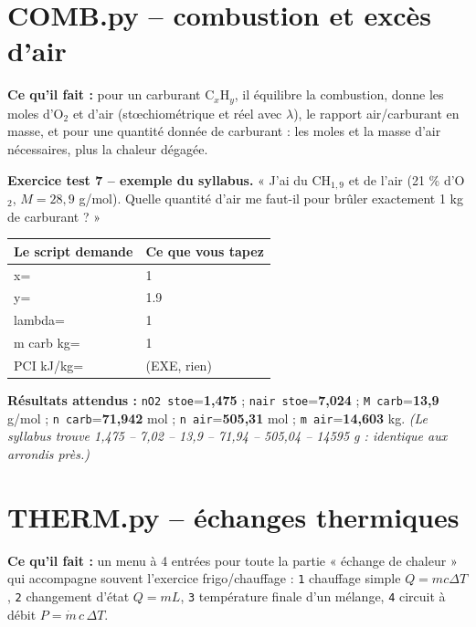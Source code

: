 \documentclass[10.5pt,a4paper]{article}
\makeatletter
\newenvironment{saisie}{%
\begin{center}\small
\begin{tabular}{@{}>{\ttfamily}l l@{}}
\toprule
\textrm{\textbf{Le script demande}} & \textbf{Ce que vous tapez} \\
\midrule
}{%
\bottomrule
\end{tabular}
\end{center}
}
\makeatother
\begin{document}
\section{COMB.py -- combustion et excès d'air}

\begin{objectif}
\textbf{Ce qu'il fait :} pour un carburant C$_x$H$_y$, il équilibre la combustion, donne les moles
d'O$_2$ et d'air (stœchiométrique et réel avec $\lambda$), le rapport air/carburant en masse, et pour
une quantité donnée de carburant : les moles et la masse d'air nécessaires, plus la chaleur dégagée.
\end{objectif}

\begin{test}
\textbf{Exercice test 7 -- exemple du syllabus.} « J'ai du CH$_{1,9}$ et de l'air (21 \% d'O$_2$,
$M=28{,}9$ g/mol). Quelle quantité d'air me faut-il pour brûler exactement 1 kg de carburant ? »

\begin{saisie}
x= & 1 \\
y= & 1.9 \\
lambda= & 1 \\
m carb kg= & 1 \\
PCI kJ/kg= & \textrm{(EXE, rien)} \\
\end{saisie}

\textbf{Résultats attendus :} \texttt{nO2 stoe}=\textbf{1,475} ; \texttt{nair stoe}=\textbf{7,024} ;
\texttt{M carb}=\textbf{13,9} g/mol ; \texttt{n carb}=\textbf{71,942} mol ;
\texttt{n air}=\textbf{505,31} mol ; \texttt{m air}=\textbf{14,603} kg.
\emph{(Le syllabus trouve 1,475 -- 7,02 -- 13,9 -- 71,94 -- 505,04 -- 14595 g : identique aux arrondis
près.)}
\end{test}

\section{THERM.py -- échanges thermiques}

\begin{objectif}
\textbf{Ce qu'il fait :} un menu à 4 entrées pour toute la partie « échange de chaleur » qui accompagne
souvent l'exercice frigo/chauffage : \texttt{1} chauffage simple $Q=mc\Delta T$, \texttt{2} changement
d'état $Q=mL$, \texttt{3} température finale d'un mélange, \texttt{4} circuit à débit
$P=\dot m\,c\,\Delta T$.
\end{objectif}
\end{document}
